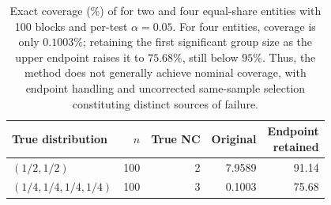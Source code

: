 \begin{table}[!t]
\centering
\caption{Exact coverage (\%) of \milad{} for two and four equal-share entities with 100 blocks and per-test $\alpha=0.05$. For four entities, coverage is only $0.1003\%$; retaining the first significant group size as the upper endpoint raises it to $75.68\%$, still below $95\%$. Thus, the method does not generally achieve nominal coverage, with endpoint handling and uncorrected same-sample selection constituting distinct sources of failure.}
\label{tab:milad-exact}
\footnotesize
\setlength{\tabcolsep}{3pt}
\renewcommand{\arraystretch}{1.12}
\begin{tabular}{@{}lrrrr@{}}
\toprule
True distribution & $n$ & True NC & Original & \shortstack{Endpoint\\retained} \\
\midrule
$(1/2,1/2)$ & 100 & 2 & 7.9589 & 91.14 \\
$(1/4,1/4,1/4,1/4)$ & 100 & 3 & 0.1003 & 75.68 \\
\bottomrule
\end{tabular}
\end{table}
